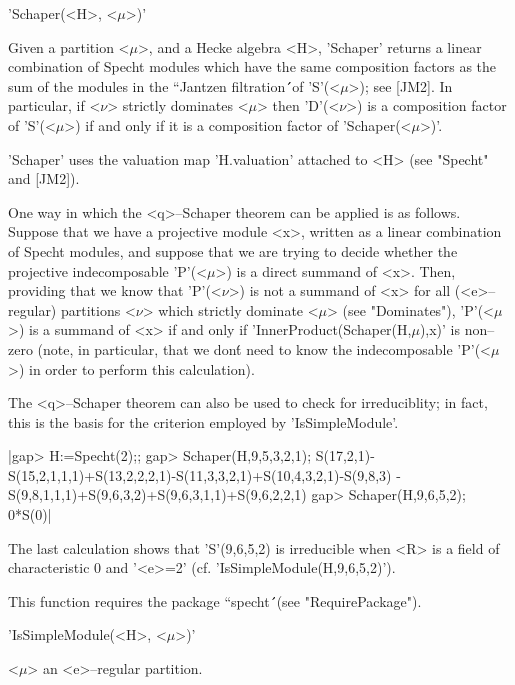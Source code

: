 

'Schaper(<H>, <$\mu$>)'

Given a partition <$\mu$>, and a Hecke algebra <H>, 'Schaper' returns a
linear combination of Specht modules which have the same composition 
factors as the sum of the modules in the ``Jantzen filtration\'\'\ of 
'S'(<$\mu$>); see [JM2]. In particular, if <$\nu$> strictly dominates 
<$\mu$> then 'D'(<$\nu$>) is a composition factor of 'S'(<$\mu$>) if and 
only if it is a composition factor of 'Schaper(<$\mu$>)'. 

'Schaper' uses the valuation map 'H.valuation' attached to <H> (see 
"Specht" and [JM2]).

One way in which the <q>--Schaper theorem can be applied is as follows. 
Suppose that we have a projective module <x>, written as a linear 
combination of Specht modules, and suppose that we are trying to decide 
whether the projective indecomposable 'P'(<$\mu$>) is a direct summand of 
<x>. Then, providing that we know that 'P'(<$\nu$>) is not a summand of 
<x> for all (<e>--regular) partitions <$\nu$> which strictly dominate 
<$\mu$> (see "Dominates"), 'P'(<$\mu$>) is a summand of <x> if and only if
'InnerProduct(Schaper(H,$\mu$),x)' is non--zero (note, in particular, that 
we don\'t need to know the indecomposable 'P'(<$\mu$>) in order to perform 
this calculation).

The <q>--Schaper theorem can also be used to check for irreduciblity; in
fact, this is the basis for the criterion employed by 'IsSimpleModule'.

|gap> H:=Specht(2);;
gap> Schaper(H,9,5,3,2,1);
S(17,2,1)-S(15,2,1,1,1)+S(13,2,2,2,1)-S(11,3,3,2,1)+S(10,4,3,2,1)-S(9,8,3)
-S(9,8,1,1,1)+S(9,6,3,2)+S(9,6,3,1,1)+S(9,6,2,2,1)
gap> Schaper(H,9,6,5,2);  
0*S(0)|

The last calculation shows that 'S'(9,6,5,2) is irreducible when <R> is a
field of characteristic $0$ and '<e>=2' (cf. 'IsSimpleModule(H,9,6,5,2)').

This function requires the package ``specht\'\'\ (see "RequirePackage").



'IsSimpleModule(<H>, <$\mu$>)'

<$\mu$> an <e>--regular partition.

